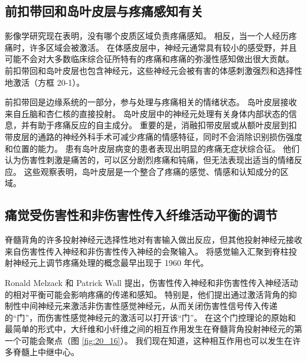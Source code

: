 \subsection{前扣带回和岛叶皮层与疼痛感知有关}
影像学研究现在表明，没有哪个皮质区域负责疼痛感知。 
相反，当一个人经历疼痛时，许多区域会被激活。 
在体感皮层中，神经元通常具有较小的感受野，并且可能不会对大多数临床综合征所特有的疼痛和疼痛的弥漫性感知做出很大贡献。 
前扣带回和岛叶皮层也包含神经元，这些神经元会被有害的体感刺激强烈和选择性地激活（方框 20-1）。


前扣带回是边缘系统的一部分，参与处理与疼痛相关的情绪状态。 
岛叶皮层接收来自丘脑和杏仁核的直接投射。 
岛叶皮层中的神经元处理有关身体内部状态的信息，并有助于疼痛反应的自主成分。 
重要的是，消融扣带皮层或从额叶皮层到扣带皮层的通路的神经外科手术可减少疼痛的情感特征，同时不会消除识别损伤强度和位置的能力。 
患有岛叶皮层病变的患者表现出明显的疼痛无症状综合征。 
他们认为伤害性刺激是痛苦的，可以区分剧烈疼痛和钝痛，但无法表现出适当的情绪反应。 
这些观察表明，岛叶皮层是一个整合了疼痛的感觉、情感和认知成分的区域。


\subsection{痛觉受伤害性和非伤害性传入纤维活动平衡的调节}
脊髓背角的许多投射神经元选择性地对有害输入做出反应，但其他投射神经元接收来自伤害性传入神经和非伤害性传入神经的会聚输入。 
将感觉输入汇聚到脊柱投射神经元上调节疼痛处理的概念最早出现于 1960 年代。


Ronald Melzack 和 Patrick Wall 提出，伤害性传入神经和非伤害性传入神经活动的相对平衡可能会影响疼痛的传递和感知。 
特别是，他们提出通过激活背角的抑制性中间神经元来激活非伤害性感觉神经元，从而关闭伤害性信号传入传递的“门”，而伤害性感觉神经元的激活可以打开该“门”。 
在这个门控理论的原始和最简单的形式中，大纤维和小纤维之间的相互作用发生在脊髓背角投射神经元的第一个可能会聚点（图 \ref{fig:20_16}）。 
我们现在知道，这种相互作用也可以发生在许多脊髓上中继中心。


